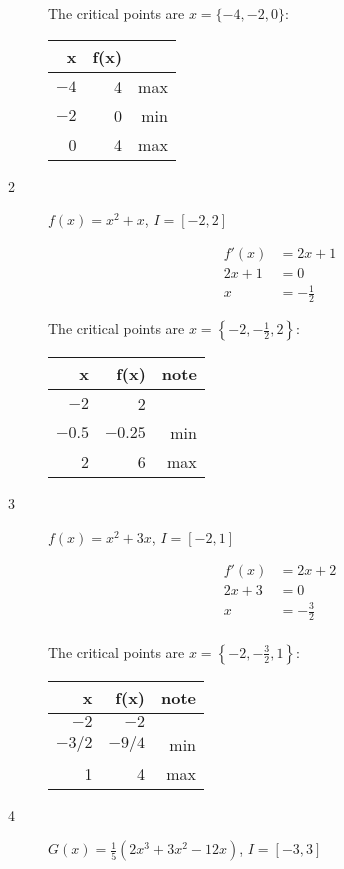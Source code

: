 \documentclass[fleqn]{exam}
\begin{document}
\begin{description}
The critical points are $x = \{-4, -2, 0 \}$:

\begin{tabular}{rrr}
\toprule
x   & f(x) & \\
\midrule
$-4$  &   4  & max \\
$-2$  &   0  & min \\
0     &   4  & max \\
\bottomrule
\end{tabular}

\item[2]
$f(x) = x^2 + x$, $I = [-2, 2]$

\begin{align*}
  f'(x) &=  2x + 1 \\
  2x + 1 &= 0 \\
  x &= - \frac{1}{2}
\end{align*}

The critical points are $x = \left\{ -2, - \frac{1}{2}, 2 \right\}$:

\begin{tabular}{rrr}
\toprule
x   & f(x) & note \\
\midrule
$-2$    &   2       &  \\
$-0.5$  &  $-0.25$  & min \\
2       &   6       & max \\
\bottomrule
\end{tabular}

\pagebreak
\item[3]
$f(x) = x^2 + 3x$, $I = [-2, 1]$

\begin{align*}
  f'(x) &= 2x + 2 \\
  2x + 3 &= 0 \\
  x &= - \frac{3}{2} \\
\end{align*}

The critical points are $x = \left\{-2, -\frac{3}{2}, 1 \right\}$:

\begin{tabular}{rrr}
\toprule
x   & f(x) & note \\
\midrule
$-2$    &  $-2$    &  \\
$-3/2$  &  $-9/4$  & min \\
1       &   4      & max \\
\bottomrule
\end{tabular}

\item[4]
$G(x) = \frac{1}{5}(2x^3 + 3x^2 - 12x)$, $I = [-3, 3]$


\end{description}
\end{document}
